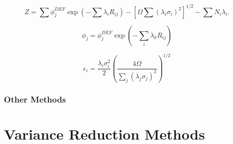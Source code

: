\begin{equation}\label{eqn:maxed-potential}
Z = \sum \phi_j^{DEF} \exp(-\sum \lambda_i R_{ij}) - [\Omega \sum (\lambda_i \sigma_i)^2]^{1/2} - \sum N_i \lambda_i .
\end{equation}

\begin{equation}\label{eqn:maxed-flux}
\phi_j = \phi_j^{DEF} \exp(- \sum_i \lambda_k R_{ij})
\end{equation}

\begin{equation}\label{eqn:maxed-error}
\epsilon_i = \frac{\lambda_i \sigma_i^2}{2} (\frac{4 \Omega}{\sum_j (\lambda_j \sigma_j)^2})^{1/2}
\end{equation}







\subsubsection{Other Methods}


\section{Variance Reduction Methods}

